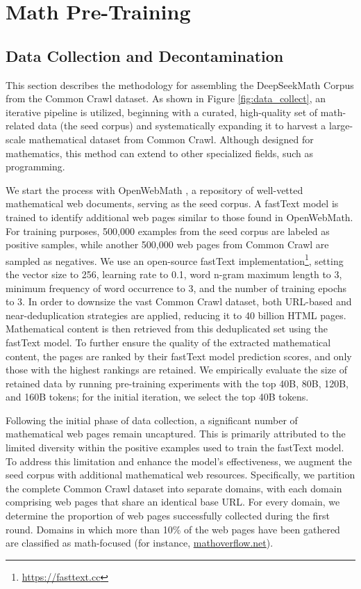 \section{Math Pre-Training}

\subsection{Data Collection and Decontamination} This section describes the methodology for assembling the DeepSeekMath Corpus from the Common Crawl dataset. As shown in Figure \ref{fig:data_collect}, an iterative pipeline is utilized, beginning with a curated, high-quality set of math-related data (the seed corpus) and systematically expanding it to harvest a large-scale mathematical dataset from Common Crawl. Although designed for mathematics, this method can extend to other specialized fields, such as programming.

We start the process with OpenWebMath \citep{openwebmath}, a repository of well-vetted mathematical web documents, serving as the seed corpus. A fastText model \citep{joulin2016fasttext} is trained to identify additional web pages similar to those found in OpenWebMath. For training purposes, 500,000 examples from the seed corpus are labeled as positive samples, while another 500,000 web pages from Common Crawl are sampled as negatives. We use an open-source fastText implementation\footnote{\url{https://fasttext.cc}}, setting the vector size to 256, learning rate to 0.1, word n-gram maximum length to 3, minimum frequency of word occurrence to 3, and the number of training epochs to 3. In order to downsize the vast Common Crawl dataset, both URL-based and near-deduplication strategies are applied, reducing it to 40 billion HTML pages. Mathematical content is then retrieved from this deduplicated set using the fastText model. To further ensure the quality of the extracted mathematical content, the pages are ranked by their fastText model prediction scores, and only those with the highest rankings are retained. We empirically evaluate the size of retained data by running pre-training experiments with the top 40B, 80B, 120B, and 160B tokens; for the initial iteration, we select the top 40B tokens.

Following the initial phase of data collection, a significant number of mathematical web pages remain uncaptured. This is primarily attributed to the limited diversity within the positive examples used to train the fastText model. To address this limitation and enhance the model's effectiveness, we augment the seed corpus with additional mathematical web resources. Specifically, we partition the complete Common Crawl dataset into separate domains, with each domain comprising web pages that share an identical base URL. For every domain, we determine the proportion of web pages successfully collected during the first round. Domains in which more than 10\% of the web pages have been gathered are classified as math-focused (for instance, \url{mathoverflow.net}). 

